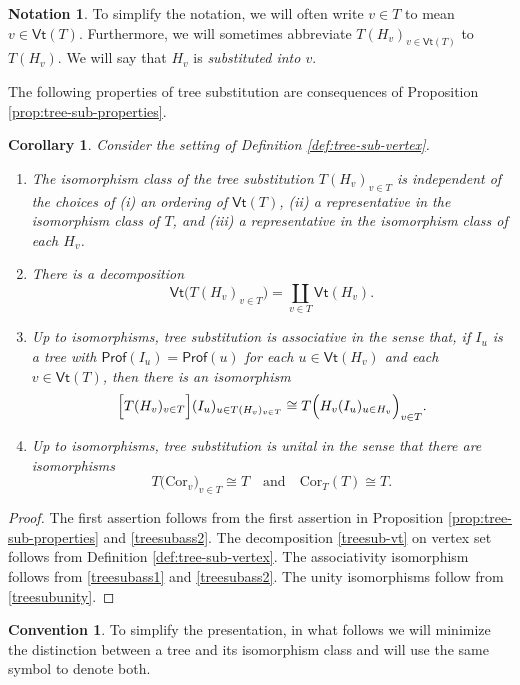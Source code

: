 \documentclass{amsbook}
\numberwithin{section}{chapter}
\numberwithin{subsection}{section}
\numberwithin{equation}{section}
\theoremstyle{plain}
\newtheorem{corollary}[equation]{Corollary}
\theoremstyle{definition}
\newtheorem{convention}[equation]{Convention}
\newtheorem{notation}[equation]{Notation}
\newcommand{\Cor}{\mathrm{Cor}}
\newcommand{\Prof}{\mathsf{Prof}}
\newcommand{\profofu}{\Prof(u)}
\newcommand{\Vt}{\mathsf{Vt}}
\newcommand{\coprodover}[1]{\underset{#1}{\coprod}}
\newcommand{\andspace}{\quad\text{and}\quad}
\begin{document}
\begin{notation}
To simplify the notation, we will often write $v\in T$ to mean $v \in \Vt(T)$.  Furthermore, we will sometimes abbreviate $T(H_v)_{v\in\Vt(T)}$ to $T(H_v)$.  We will say that $H_v$ is \emph{substituted into $v$}.
\end{notation}

The following properties of tree substitution are consequences of Proposition \ref{prop:tree-sub-properties}.

\begin{corollary}\label{cor:treesub-assunity}
Consider the setting of Definition \ref{def:tree-sub-vertex}.
\begin{enumerate} \item The isomorphism class of the tree substitution $T(H_v)_{v\in T}$ is independent of the choices of (i) an ordering of $\Vt(T)$, (ii) a representative in the isomorphism class of $T$, and (iii) a representative in the isomorphism class of each $H_v$.
\item There is a decomposition 
\begin{equation}\label{treesub-vt}
\Vt\bigl(T(H_v)_{v\in T}\bigr)=\coprodover{v\in T} \Vt(H_v).
\end{equation}
\item Up to isomorphisms, tree substitution is associative in the sense that, if $I_u$ is a tree with $\Prof(I_u) = \profofu$ for each $u \in \Vt(H_v)$ and each $v \in \Vt(T)$, then there is an isomorphism
\[\Bigl[T(H_v)_{v\in T}\Bigr](I_u)_{u\in T(H_v)_{v\in T}} \cong T\Bigl(H_v(I_u)_{u\in H_v}\Bigr)_{v\in T}.\]
\item Up to isomorphisms, tree substitution is unital in the sense that there are isomorphisms
\[T\bigl(\Cor_v\bigr)_{v\in T} \cong T \andspace \Cor_T(T) \cong T.\]
\end{enumerate}
\end{corollary}

\begin{proof}
The first assertion follows from the first assertion in Proposition \ref{prop:tree-sub-properties} and \eqref{treesubass2}.  The decomposition \ref{treesub-vt} on vertex set follows from Definition \ref{def:tree-sub-vertex}.  The associativity isomorphism follows from \eqref{treesubass1} and \eqref{treesubass2}.  The unity isomorphisms follow from \eqref{treesubunity}.
\end{proof}

\begin{convention}\label{conv:tree-isoclass}
To simplify the presentation, in what follows we will minimize the distinction between a tree and its isomorphism class and will use the same symbol to denote both.
\end{convention}
\end{document}
